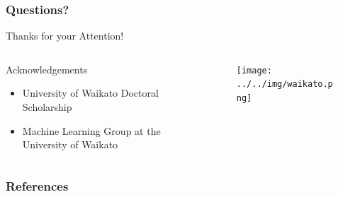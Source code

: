 \documentclass[handout]{beamer}
\begin{document}
\begin{frame}
\frametitle{Questions?}
\begin{center}\LARGE Thanks for your Attention!\\ \end{center}

\begin{columns}
\begin{column}{0.55\textwidth}
\begin{block}{Acknowledgements}
\begin{itemize}\tiny
	\item University of Waikato Doctoral Scholarship
	\item Machine Learning Group at the University of Waikato
	
\end{itemize}
\end{block}
\end{column}
\begin{column}{0.45\textwidth}
\vspace{1.5cm}

\begin{figure}[h!]
	\centering
	\texttt{[image: ../../img/waikato.png]}
\end{figure}
\end{column}
\end{columns}

\end{frame}

\begin{frame}[allowframebreaks]\scriptsize
\frametitle{References}


%
\end{frame}  


\end{document}

